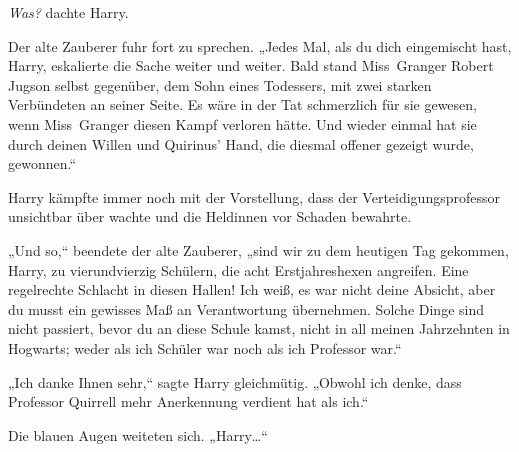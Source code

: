 \emph{Was?} dachte Harry.

Der alte Zauberer fuhr fort zu sprechen. „Jedes Mal, als du dich eingemischt hast, Harry, eskalierte die Sache weiter und weiter. Bald stand Miss~Granger Robert Jugson selbst gegenüber, dem Sohn eines Todessers, mit zwei starken Verbündeten an seiner Seite. Es wäre in der Tat schmerzlich für sie gewesen, wenn Miss~Granger diesen Kampf verloren hätte. Und wieder einmal hat sie durch deinen Willen und Quirinus' Hand, die diesmal offener gezeigt wurde, gewonnen.“

Harry kämpfte immer noch mit der Vorstellung, dass der Verteidigungsprofessor unsichtbar über \SPHEW wachte und die Heldinnen vor Schaden bewahrte.

„Und so,“ beendete der alte Zauberer, „sind wir zu dem heutigen Tag gekommen, Harry, zu vierundvierzig Schülern, die acht Erstjahreshexen angreifen. Eine regelrechte Schlacht in diesen Hallen! Ich weiß, es war nicht deine Absicht, aber du musst ein gewisses Maß an Verantwortung übernehmen. Solche Dinge sind nicht passiert, bevor du an diese Schule kamst, nicht in all meinen Jahrzehnten in Hogwarts; weder als ich Schüler war noch als ich Professor war.“

„Ich danke Ihnen sehr,“ sagte Harry gleichmütig. „Obwohl ich denke, dass Professor Quirrell mehr Anerkennung verdient hat als ich.“

Die blauen Augen weiteten sich. „Harry…“

